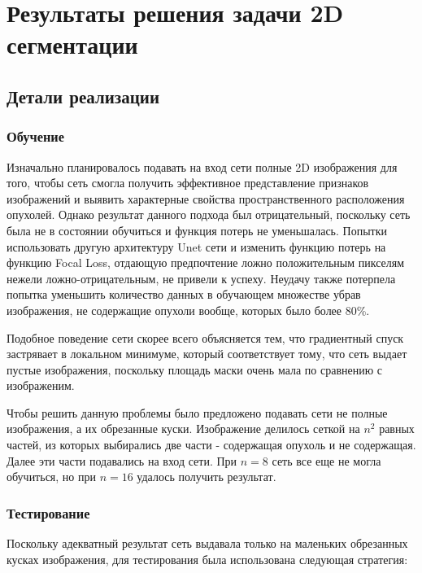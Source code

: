 \chapter{Результаты решения задачи 2D сегментации}


\section{Детали реализации}

\subsection{Обучение}

Изначально планировалось подавать на вход сети полные 2D изображения для того, чтобы сеть смогла получить эффективное представление признаков изображений и выявить характерные свойства пространственного расположения опухолей. Однако результат данного подхода был отрицательный, поскольку сеть была не в состоянии обучиться и функция потерь не уменьшалась. Попытки использовать другую архитектуру Unet сети и изменить функцию потерь на функцию Focal Loss, отдающую предпочтение ложно положительным пикселям нежели ложно-отрицательным, не привели к успеху. Неудачу также потерпела попытка уменьшить количество данных в обучающем множестве убрав изображения, не содержащие опухоли вообще, которых было более 80\%.

Подобное поведение сети скорее всего объясняется тем, что градиентный спуск застрявает в локальном минимуме, который соответствует тому, что сеть выдает пустые изображения, поскольку площадь маски очень мала по сравнению с изображеним.

Чтобы решить данную проблемы было предложено подавать сети не полные изображения, а их обрезанные куски. Изображение делилось сеткой на $n^2$ равных частей, из которых выбирались две части - содержащая опухоль и не содержащая. Далее эти части подавались на вход сети. При $n = 8$ сеть все еще не могла обучиться, но при $n = 16$ удалось получить результат.

\subsection{Тестирование}

Поскольку адекватный результат сеть выдавала только на маленьких обрезанных кусках изображения, для тестирования была использована следующая стратегия:

